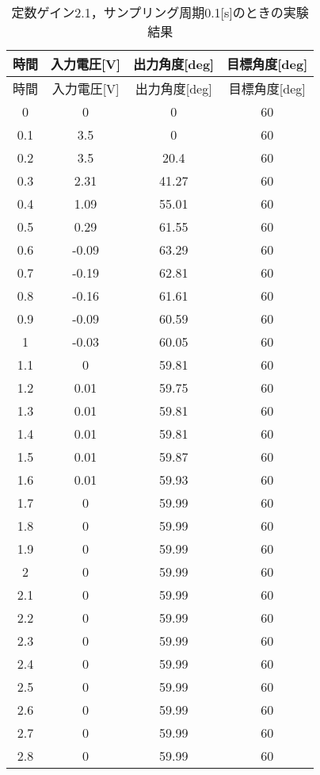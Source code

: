 \begin{longtable}[c]{|c|c|c|c|}
  \caption{定数ゲイン2.1，サンプリング周期0.1[s]のときの実験結果}
  \label{tab6} \\
  \hline
   時間& 	入力電圧[V]&	出力角度[deg]&	目標角度[deg] \\ \hline \hline \endfirsthead 
\hline \endhead
\hline \endfoot
\hline \endlastfoot
時間& 	入力電圧[V]&    出力角度[deg]&	目標角度[deg] \\ \hline
0   &	0    &	0     &	60 \\ \hline 
0.1 &	3.5  &	0     &	60 \\ \hline 
0.2 &	3.5  &	20.4  &	60 \\ \hline 
0.3 &	2.31 &	41.27 &	60 \\ \hline 
0.4 &	1.09 &	55.01 &	60 \\ \hline 
0.5 &	0.29 &	61.55 &	60 \\ \hline 
0.6 &	-0.09&	63.29 &	60 \\ \hline 
0.7 &	-0.19&	62.81 &	60 \\ \hline 
0.8 &	-0.16&	61.61 &	60 \\ \hline 
0.9 &	-0.09&	60.59 &	60 \\ \hline 
1   &	-0.03&	60.05 &	60 \\ \hline 
1.1 &	0    &	59.81 &	60 \\ \hline 
1.2 &	0.01 &	59.75 &	60 \\ \hline 
1.3 &	0.01 &	59.81 &	60 \\ \hline 
1.4 &	0.01 &	59.81 &	60 \\ \hline 
1.5 &	0.01 &	59.87 &	60 \\ \hline 
1.6 &	0.01 &	59.93 &	60 \\ \hline 
1.7 &	0    &	59.99 &	60 \\ \hline 
1.8 &	0    &	59.99 &	60 \\ \hline 
1.9 &	0    &	59.99 &	60 \\ \hline 
2   &	0    &	59.99 &	60 \\ \hline 
2.1 &	0    &	59.99 &	60 \\ \hline 
2.2 &	0    &	59.99 &	60 \\ \hline 
2.3 &	0    &	59.99 &	60 \\ \hline 
2.4 &	0    &	59.99 &	60 \\ \hline 
2.5 &	0    &	59.99 &	60 \\ \hline 
2.6 &	0    &	59.99 &	60 \\ \hline 
2.7 &	0    &	59.99 &	60 \\ \hline 
2.8 &	0    &	59.99 &	60 \\ \hline 

\end{longtable}
